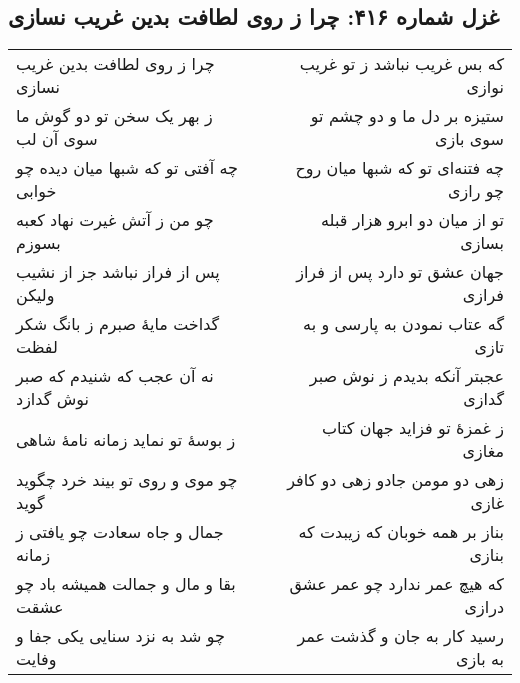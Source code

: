 \begin{center}
\section*{غزل شماره ۴۱۶: چرا ز روی لطافت بدین غریب نسازی}
\label{sec:416}
\begin{longtable}{l p{0.5cm} r}
چرا ز روی لطافت بدین غریب نسازی
&&
که بس غریب نباشد ز تو غریب نوازی
\\
ز بهر یک سخن تو دو گوش ما سوی آن لب
&&
ستیزه بر دل ما و دو چشم تو سوی بازی
\\
چه آفتی تو که شبها میان دیده چو خوابی
&&
چه فتنه‌ای تو که شبها میان روح چو رازی
\\
چو من ز آتش غیرت نهاد کعبه بسوزم
&&
تو از میان دو ابرو هزار قبله بسازی
\\
پس از فراز نباشد جز از نشیب ولیکن
&&
جهان عشق تو دارد پس از فراز فرازی
\\
گداخت مایهٔ صبرم ز بانگ شکر لفظت
&&
گه عتاب نمودن به پارسی و به تازی
\\
نه آن عجب که شنیدم که صبر نوش گدازد
&&
عجبتر آنکه بدیدم ز نوش صبر گدازی
\\
ز بوسهٔ تو نماید زمانه نامهٔ شاهی
&&
ز غمزهٔ تو فزاید جهان کتاب مغازی
\\
چو موی و روی تو بیند خرد چگوید گوید
&&
زهی دو مومن جادو زهی دو کافر غازی
\\
جمال و جاه سعادت چو یافتی ز زمانه
&&
بناز بر همه خوبان که زیبدت که بنازی
\\
بقا و مال و جمالت همیشه باد چو عشقت
&&
که هیچ عمر ندارد چو عمر عشق درازی
\\
چو شد به نزد سنایی یکی جفا و وفایت
&&
رسید کار به جان و گذشت عمر به بازی
\\
\end{longtable}
\end{center}
